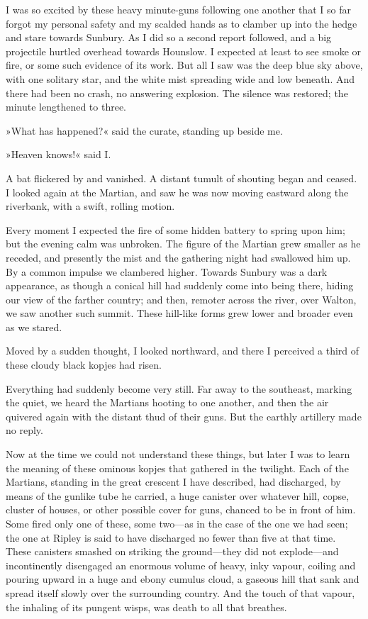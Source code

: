 I was so excited by these heavy minute-guns following one another that I so far forgot my personal safety and my scalded hands as to clamber up into the hedge and stare towards Sunbury. As I did so a second report followed, and a big projectile hurtled overhead towards Hounslow. I expected at least to see smoke or fire, or some such evidence of its work. But all I saw was the deep blue sky above, with one solitary star, and the white mist spreading wide and low beneath. And there had been no crash, no answering explosion. The silence was restored; the minute lengthened to three.

»What has happened?« said the curate, standing up beside me.

»Heaven knows!« said I\@.

A bat flickered by and vanished. A distant tumult of shouting began and ceased. I looked again at the Martian, and saw he was now moving eastward along the riverbank, with a swift, rolling motion.

Every moment I expected the fire of some hidden battery to spring upon him; but the evening calm was unbroken. The figure of the Martian grew smaller as he receded, and presently the mist and the gathering night had swallowed him up. By a common impulse we clambered higher. Towards Sunbury was a dark appearance, as though a conical hill had suddenly come into being there, hiding our view of the farther country; and then, remoter across the river, over Walton, we saw another such summit. These hill-like forms grew lower and broader even as we stared.

Moved by a sudden thought, I looked northward, and there I perceived a third of these cloudy black kopjes had risen.

Everything had suddenly become very still. Far away to the southeast, marking the quiet, we heard the Martians hooting to one another, and then the air quivered again with the distant thud of their guns. But the earthly artillery made no reply.

Now at the time we could not understand these things, but later I was to learn the meaning of these ominous kopjes that gathered in the twilight. Each of the Martians, standing in the great crescent I have described, had discharged, by means of the gunlike tube he carried, a huge canister over whatever hill, copse, cluster of houses, or other possible cover for guns, chanced to be in front of him. Some fired only one of these, some two—as in the case of the one we had seen; the one at Ripley is said to have discharged no fewer than five at that time. These canisters smashed on striking the ground—they did not explode—and incontinently disengaged an enormous volume of heavy, inky vapour, coiling and pouring upward in a huge and ebony cumulus cloud, a gaseous hill that sank and spread itself slowly over the surrounding country. And the touch of that vapour, the inhaling of its pungent wisps, was death to all that breathes.

